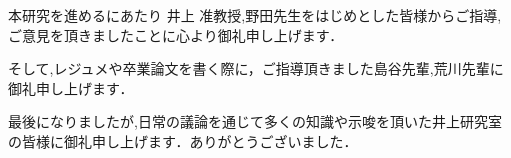\theacknowledgments

本研究を進めるにあたり 井上 准教授,野田先生をはじめとした皆様からご指導,ご意見を頂きましたことに心より御礼申し上げます．

そして,レジュメや卒業論文を書く際に，ご指導頂きました島谷先輩,荒川先輩に御礼申し上げます．

最後になりましたが,日常の議論を通じて多くの知識や示唆を頂いた井上研究室の皆様に御礼申し上げます．ありがとうございました．
